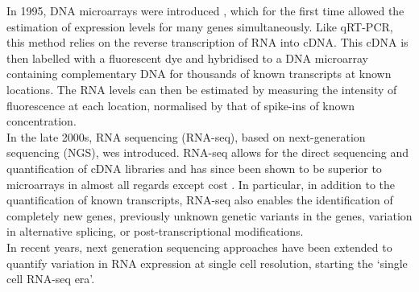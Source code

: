 In 1995, DNA microarrays were introduced \cite{schena1995quantitative}, which for the first time allowed the estimation of expression levels for many genes simultaneously.
Like qRT-PCR, this method relies on the reverse transcription of RNA into cDNA.
This cDNA is then labelled with a fluorescent dye and hybridised to a DNA microarray containing complementary DNA for thousands of known transcripts at known locations. 
The RNA levels can then be estimated by measuring the intensity of fluorescence at each location, normalised by that of spike-ins of known concentration. 
\\

In the late 2000s, RNA sequencing (RNA-seq), based on next-generation sequencing (NGS), 
wes introduced.
RNA-seq allows for the direct sequencing and quantification of cDNA libraries \cite{mortazavi2008mapping} and has since been shown to be superior to microarrays in almost all regards except cost \cite{marioni2008rna}. 
In particular, in addition to the quantification of known transcripts, RNA-seq also enables the identification of completely new genes, previously unknown genetic variants in the genes, variation in alternative splicing, or post-transcriptional modifications. \\

In recent years, next generation sequencing approaches have been extended to quantify variation in RNA expression at single cell resolution, starting the `single cell RNA-seq era'.




